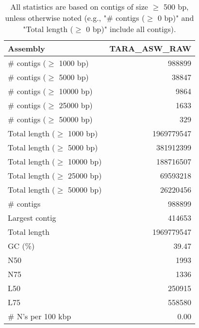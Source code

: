 \documentclass[12pt,a4paper]{article}
\begin{document}
\begin{table}[ht]
\begin{center}
\caption{All statistics are based on contigs of size $\geq$ 500 bp, unless otherwise noted (e.g., "\# contigs ($\geq$ 0 bp)" and "Total length ($\geq$ 0 bp)" include all contigs).}
\begin{tabular}{|l*{1}{|r}|}
\hline
Assembly & TARA\_ASW\_RAW \\ \hline
\# contigs ($\geq$ 1000 bp) & 988899 \\ \hline
\# contigs ($\geq$ 5000 bp) & 38847 \\ \hline
\# contigs ($\geq$ 10000 bp) & 9864 \\ \hline
\# contigs ($\geq$ 25000 bp) & 1633 \\ \hline
\# contigs ($\geq$ 50000 bp) & 329 \\ \hline
Total length ($\geq$ 1000 bp) & 1969779547 \\ \hline
Total length ($\geq$ 5000 bp) & 381912399 \\ \hline
Total length ($\geq$ 10000 bp) & 188716507 \\ \hline
Total length ($\geq$ 25000 bp) & 69593218 \\ \hline
Total length ($\geq$ 50000 bp) & 26220456 \\ \hline
\# contigs & 988899 \\ \hline
Largest contig & 414653 \\ \hline
Total length & 1969779547 \\ \hline
GC (\%) & 39.47 \\ \hline
N50 & 1993 \\ \hline
N75 & 1336 \\ \hline
L50 & 250915 \\ \hline
L75 & 558580 \\ \hline
\# N's per 100 kbp & 0.00 \\ \hline
\end{tabular}
\end{center}
\end{table}
\end{document}
